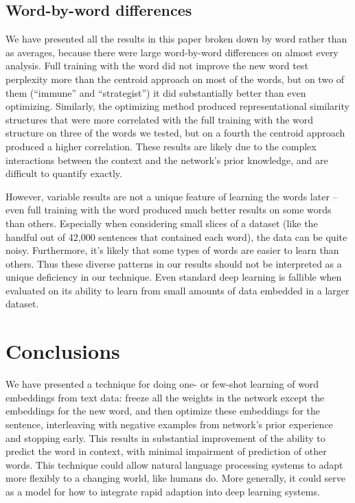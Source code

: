 \documentclass{article}
\begin{document}
\subsection{Word-by-word differences}
We have presented all the results in this paper broken down by word rather than as averages, because there were large word-by-word differences on almost every analysis. Full training with the word did not improve the new word test perplexity more than the centroid approach on most of the words, but on two of them (``immune'' and ``strategist'') it did substantially better than even optimizing. Similarly, the optimizing method produced representational similarity structures that were more correlated with the full training with the word structure on three of the words we tested, but on a fourth the centroid approach produced a higher correlation. These results are likely due to the complex interactions between the context and the network's prior knowledge, and are difficult to quantify exactly. \par
However, variable results are not a unique feature of learning the words later -- even full training with the word produced much better results on some words than others. Especially when considering small slices of a dataset (like the handful out of 42,000 sentences that contained each word), the data can be quite noisy. Furthermore, it's likely that some types of words are easier to learn than others. Thus these diverse patterns in our results should not be interpreted as a unique deficiency in our technique. Even standard deep learning is fallible when evaluated on its ability to learn from small amounts of data embedded in a larger dataset. \par
\section{Conclusions}
We have presented a technique for doing one- or few-shot learning of word embeddings from text data: freeze all the weights in the network except the embeddings for the new word, and then optimize these embeddings for the sentence, interleaving with negative examples from network's prior experience and stopping early. This results in substantial improvement of the ability to predict the word in context, with minimal impairment of prediction of other words. This technique could allow natural language processing systems to adapt more flexibly to a changing world, like humans do. More generally, it could serve as a model for how to integrate rapid adaption into deep learning systems. \par 


\newpage
\appendix
\end{document}
